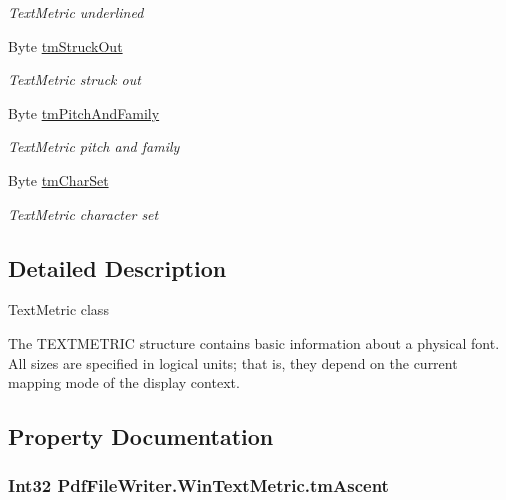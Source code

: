 \begin{DoxyCompactItemize}
\begin{DoxyCompactList}\small\item\em Text\+Metric underlined \end{DoxyCompactList}\item 
Byte \hyperlink{class_pdf_file_writer_1_1_win_text_metric_a97c902bffde99c2cec601f3a263bb1e0}{tm\+Struck\+Out}
\begin{DoxyCompactList}\small\item\em Text\+Metric struck out \end{DoxyCompactList}\item 
Byte \hyperlink{class_pdf_file_writer_1_1_win_text_metric_ad557d75a4c414b8531c2b94af735dd3f}{tm\+Pitch\+And\+Family}
\begin{DoxyCompactList}\small\item\em Text\+Metric pitch and family \end{DoxyCompactList}\item 
Byte \hyperlink{class_pdf_file_writer_1_1_win_text_metric_a8248eca35a5955b591a197131ed35657}{tm\+Char\+Set}
\begin{DoxyCompactList}\small\item\em Text\+Metric character set \end{DoxyCompactList}\end{DoxyCompactItemize}


\subsection{Detailed Description}
Text\+Metric class 

The T\+E\+X\+T\+M\+E\+T\+R\+IC structure contains basic information about a physical font. All sizes are specified in logical units; that is, they depend on the current mapping mode of the display context. 

\subsection{Property Documentation}
\subsubsection[{\texorpdfstring{tm\+Ascent}{tmAscent}}]{\setlength{\rightskip}{0pt plus 5cm}Int32 Pdf\+File\+Writer.\+Win\+Text\+Metric.\+tm\+Ascent\hspace{0.3cm}{\ttfamily [get]}}\hypertarget{class_pdf_file_writer_1_1_win_text_metric_a1a2b73c4ecb48b4aff0942fc11a3ee12}{}\label{class_pdf_file_writer_1_1_win_text_metric_a1a2b73c4ecb48b4aff0942fc11a3ee12}


